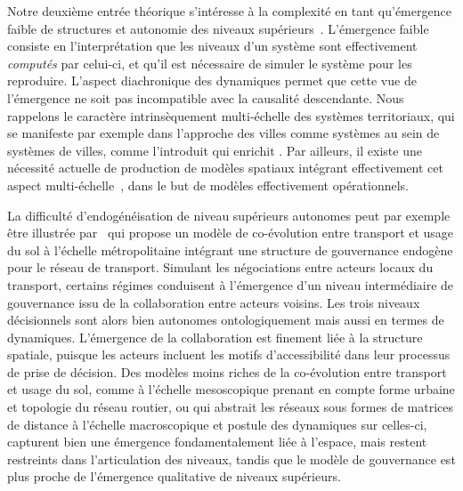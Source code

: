 \documentclass[11pt]{article}
\begin{document}
Notre deuxième entrée théorique s'intéresse à la complexité en tant qu'émergence faible de structures et autonomie des niveaux supérieurs~\citep{bedau2002downward}. L'émergence faible consiste en l'interprétation que les niveaux d'un système sont effectivement \emph{computés} \citep{morin1980methode} par celui-ci, et qu'il est nécessaire de simuler le système pour les reproduire. L'aspect diachronique des dynamiques permet que cette vue de l'émergence ne soit pas incompatible avec la causalité descendante. Nous rappelons le caractère intrinsèquement multi-échelle des systèmes territoriaux, qui se manifeste par exemple dans l'approche des villes comme systèmes au sein de systèmes de villes, comme l'introduit \cite{pumain1997pour} qui enrichit \cite{berry1964cities}. Par ailleurs, il existe une nécessité actuelle de production de modèles spatiaux intégrant effectivement cet aspect multi-échelle~\citep{rozenblat2018conclusion}, dans le but de modèles effectivement opérationnels.

La difficulté d'endogénéisation de niveau supérieurs autonomes peut par exemple être illustrée par~\cite{lenechet:halshs-01272236} qui propose un modèle de co-évolution entre transport et usage du sol à l'échelle métropolitaine intégrant une structure de gouvernance endogène pour le réseau de transport. Simulant les négociations entre acteurs locaux du transport, certains régimes conduisent à l'émergence d'un niveau intermédiaire de gouvernance issu de la collaboration entre acteurs voisins. Les trois niveaux décisionnels sont alors bien autonomes ontologiquement mais aussi en termes de dynamiques. L'émergence de la collaboration est finement liée à la structure spatiale, puisque les acteurs incluent les motifs d'accessibilité dans leur processus de prise de décision. Des modèles moins riches de la co-évolution entre transport et usage du sol, comme \cite{raimbault2018urban} à l'échelle mesoscopique prenant en compte forme urbaine et topologie du réseau routier, ou \cite{raimbault2018modeling} qui abstrait les réseaux sous formes de matrices de distance à l'échelle macroscopique et postule des dynamiques sur celles-ci, capturent bien une émergence fondamentalement liée à l'espace, mais restent restreints dans l'articulation des niveaux, tandis que le modèle de gouvernance est plus proche de l'émergence qualitative de niveaux supérieurs.
\end{document}
